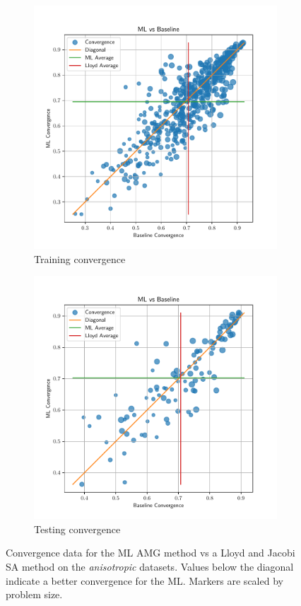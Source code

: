 \documentclass{article}
\begin{document}
\begin{figure}[!hb]
  \centering
  \begin{subfigure}[t]{0.49\textwidth}
    \centering
    \includegraphics[width=\textwidth]{aniso3d_train_baseline_ml_convergence.pdf}
    \caption{Training convergence}
  \end{subfigure}
  \begin{subfigure}[t]{0.49\textwidth}
    \centering
    \includegraphics[width=\textwidth]{aniso3d_test_baseline_ml_convergence.pdf}
    \caption{Testing convergence}
  \end{subfigure}
  \caption{Convergence data for the ML AMG method vs a Lloyd and Jacobi SA method on the \textit{anisotropic} datasets.  Values below the diagonal indicate a better convergence for the ML.  Markers are scaled by problem size.}
  \label{fig:aniso_conv}
\end{figure}
\end{document}
